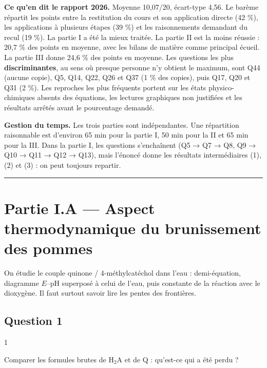 \documentclass[11pt,a4paper]{article}
\begin{document}
\textbf{Ce qu'en dit le rapport 2026.} Moyenne 10,07/20, écart-type 4,56. Le barème répartit les points entre la restitution du cours et son application directe (42 \%), les applications à plusieurs étapes (39 \%) et les raisonnements demandant du recul (19 \%). La partie I a été la mieux traitée. La partie II est la moins réussie : 20,7 \% des points en moyenne, avec les bilans de matière comme principal écueil. La partie III donne 24,6 \% des points en moyenne. Les questions les plus \textbf{discriminantes}, au sens où presque personne n'y obtient le maximum, sont Q44 (aucune copie), Q5, Q14, Q22, Q26 et Q37 (1 \% des copies), puis Q17, Q20 et Q31 (2 \%). Les reproches les plus fréquents portent sur les états physico-chimiques absents des équations, les lectures graphiques non justifiées et les résultats arrêtés avant le pourcentage demandé.

\textbf{Gestion du temps.} Les trois parties sont indépendantes. Une répartition raisonnable est d'environ 65 min pour la partie I, 50 min pour la II et 65 min pour la III. Dans la partie I, les questions s'enchaînent (Q5 → Q7 → Q8, Q9 → Q10 → Q11 → Q12 → Q13), mais l'énoncé donne les résultats intermédiaires (1), (2) et (3) : on peut toujours repartir.

\begin{center}\rule{0.5\linewidth}{0.5pt}\end{center}

\hypertarget{partie-i.a-aspect-thermodynamique-du-brunissement-des-pommes}{%
\section{Partie I.A --- Aspect thermodynamique du brunissement des pommes}\label{partie-i.a-aspect-thermodynamique-du-brunissement-des-pommes}}

On étudie le couple quinone / 4-méthylcatéchol dans l'eau : demi-équation, diagramme \(E\)--pH superposé à celui de l'eau, puis constante de la réaction avec le dioxygène. Il faut surtout savoir lire les pentes des frontières.

\hypertarget{question-1}{%
\subsection{Question 1}\label{question-1}}

\begin{indication}{1}

Comparer les formules brutes de \(\mathrm{H_2A}\) et de Q : qu'est-ce qui a été perdu ?

\end{indication}
\end{document}
